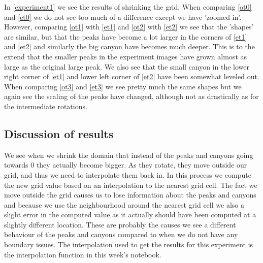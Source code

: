 In \autoref{experiment1} we see the results of shrinking the grid. When comparing \autoref{ot0} and \autoref{et0} we do not see too much of a difference except we have 'zoomed in'. However, comparing \autoref{ot1} with \autoref{et1} and \autoref{ot2} with \autoref{et2} we see that the 'shapes' are similar, but that the peaks have become a lot larger in the corners of \autoref{et1} and \autoref{et2} and similarly the big canyon have becomes much deeper. This is to the extend that the smaller peaks in the experiment images have grown almost as large as the original large peak. We also see that the small canyon in the lower right corner of \autoref{et1} and lower left corner of \autoref{et2} have been somewhat leveled out. When comparing \autoref{ot3} and \autoref{et3} we see pretty much the same shapes but we again see the scaling of the peaks have changed, although not as drastically as for the intermediate rotations.

\subsection{Discussion of results}
We see when we shrink the domain that instead of the peaks and canyons going towards 0 they actually become bigger. As they rotate, they move outside our grid, and thus we need to interpolate them back in. In this process we compute the new grid value based on an interpolation to the nearest grid cell. The fact we move outside the grid causes us to lose information about the peaks and canyons and because we use the neighbourhood around the nearest grid cell we also a slight error in the computed value as it actually should have been computed at a slightly different location. These are probably the causes we see a different behaviour of the peaks and canyons compared to when we do not have any boundary issues. The interpolation used to get the results for this experiment is the interpolation function in this week's notebook.
